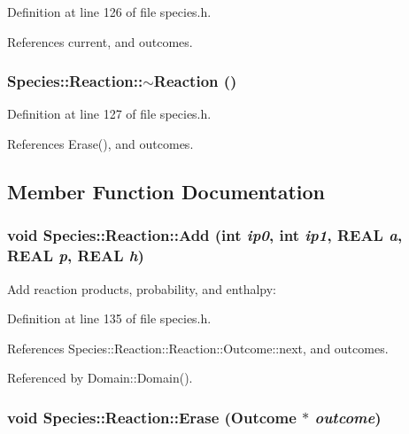 Definition at line 126 of file species.h.

References current, and outcomes.\hypertarget{structSpecies_1_1Reaction_4a5235ff4fada5966f38ac8e0ff2b56b}{
\subsubsection[{$\sim$Reaction}]{\setlength{\rightskip}{0pt plus 5cm}Species::Reaction::$\sim$Reaction ()}}
\label{structSpecies_1_1Reaction_4a5235ff4fada5966f38ac8e0ff2b56b}




Definition at line 127 of file species.h.

References Erase(), and outcomes.

\subsection{Member Function Documentation}
\hypertarget{structSpecies_1_1Reaction_bf043ef67abfae073216b5aa48163315}{
\subsubsection[{Add}]{\setlength{\rightskip}{0pt plus 5cm}void Species::Reaction::Add (int {\em ip0}, \/  int {\em ip1}, \/  REAL {\em a}, \/  REAL {\em p}, \/  REAL {\em h})}}
\label{structSpecies_1_1Reaction_bf043ef67abfae073216b5aa48163315}




Add reaction products, probability, and enthalpy: 

Definition at line 135 of file species.h.

References Species::Reaction::Reaction::Outcome::next, and outcomes.

Referenced by Domain::Domain().\hypertarget{structSpecies_1_1Reaction_8054a4e4db808d4cfff326f38dec8825}{
\subsubsection[{Erase}]{\setlength{\rightskip}{0pt plus 5cm}void Species::Reaction::Erase ({\bf Outcome} $\ast$ {\em outcome})}}
\label{structSpecies_1_1Reaction_8054a4e4db808d4cfff326f38dec8825}




